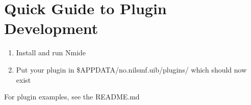 \section{Quick Guide to Plugin Development}

\begin{enumerate}
  \item Install and run Nmide
  \item Put your plugin in \$APPDATA/no.nilsmf.uib/plugins/ which should now exist
\end{enumerate}


For plugin examples, see the README.md
